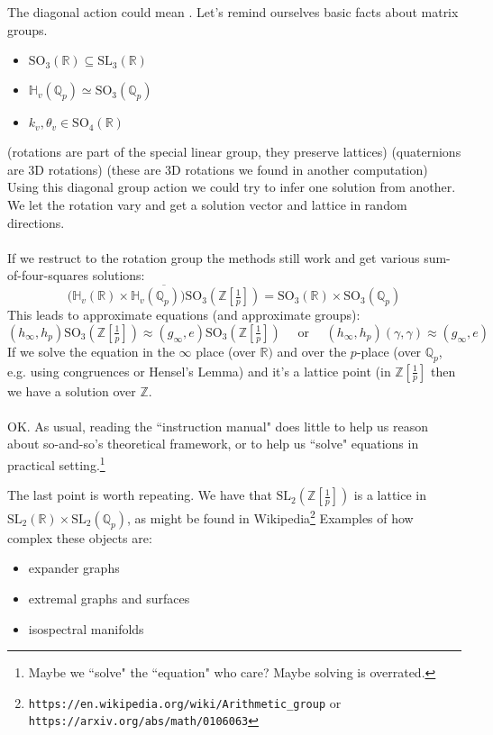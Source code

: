 \documentclass[12pt]{article}
\begin{document}
{The diagonal action could mean .  Let's remind ourselves basic facts about matrix groups.
\begin{itemize}
\item $\text{SO}_3(\mathbb{R}) \subseteq \text{SL}_3(\mathbb{R}) $ 
\item $\mathbb{H}_v(\mathbb{Q}_p) \simeq \text{SO}_3(\mathbb{Q}_p)$ 
\item $k_v, \theta_v \in \text{SO}_4(\mathbb{R})$ 
\end{itemize}
(rotations are part of the special linear group, they preserve lattices) (quaternions are 3D rotations) (these are 3D rotations we found  in another computation)  Using this diagonal group action we could try to infer one solution from another.  We let the rotation vary and get a solution vector and lattice in random directions. \\ \\
If we restruct to the rotation group the methods still work and get various sum-of-four-squares solutions:
$$\overline{ \big(\mathbb{H}_v(\mathbb{R}) \times \mathbb{H}_v(\mathbb{Q}_p)\big) \text{SO}_3(\mathbb{Z}[\tfrac{1}{p}]) }  = \text{SO}_3(\mathbb{R}) \times \text{SO}_3(\mathbb{Q}_p) $$
This leads to approximate equations (and approximate groups):
$$  (h_\infty, h_p) \text{SO}_3(\mathbb{Z}[\tfrac{1}{p}]) \approx (g_\infty, e)\text{SO}_3(\mathbb{Z}[\tfrac{1}{p}]) \quad\text{ or }\quad
(h_\infty, h_p) (\gamma, \gamma) \approx (g_\infty, e)$$
If we solve the equation in the $\infty$ place (over $\mathbb{R})$ and over the $p$-place 
(over $\mathbb{Q}_p$, e.g. using congruences or Hensel's Lemma) and it's a lattice point (in $\mathbb{Z}[\frac{1}{p}]$ then we have a solution over $\mathbb{Z}$. \\ \\
OK.  As usual, reading the ``instruction manual" does little to help us reason about so-and-so's theoretical framework, or to help us ``solve" equations in practical setting.\footnote{Maybe we ``solve" the ``equation" who care?  Maybe solving is overrated.}
}

\newpage

 The last point is worth repeating.  We have that $\text{SL}_2(\mathbb{Z}[\frac{1}{p}])$ is a lattice in $\text{SL}_2(\mathbb{R}) \times \text{SL}_2(\mathbb{Q}_p)$, as might be found in Wikipedia\footnote{\texttt{https://en.wikipedia.org/wiki/Arithmetic\_{}group} or \texttt{https://arxiv.org/abs/math/0106063}} Examples of how complex these objects are:
\begin{itemize}
\item expander graphs
\item extremal graphs and surfaces
\item isospectral manifolds
\end{itemize}
\end{document}
